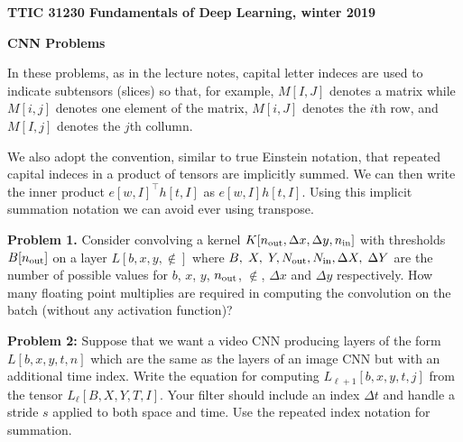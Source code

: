 \documentclass{article}
\newcommand{\solution}[1]{}
\begin{document}
\centerline{\bf TTIC 31230 Fundamentals of Deep Learning, winter 2019}

\medskip
\centerline{\bf CNN Problems}

In these problems, as in the lecture notes, capital letter indeces are used to indicate subtensors (slices) so that, for example,  $M[I,J]$ denotes a matrix
while $M[i,j]$ denotes one element of the matrix, $M[i,J]$ denotes the $i$th row, and $M[I,j]$ denotes the $j$th collumn.

\medskip
We also adopt the convention, similar to true Einstein notation, that repeated capital indeces in a product of tensors are implicitly summed.  We can then write
the inner product $e[w,I]^\top h[t,I]$ as $e[w,I]h[t,I]$.  Using this implicit summation notation we can avoid ever using transpose.

\bigskip
{\bf Problem 1.}  Consider convolving a kernel $K[n_{\mathrm{out}},\Delta x, \Delta y,n_{\mathrm{in}}]$  with thresholds $B[n_{\mathrm{out}}]$ on a layer $L[b,x,y,\nin]$ where $B,\;X,\;Y,N_{\mathrm{out}}, N_{\mathrm{in}},\Delta X,\;\Delta Y$
are the number of possible values for $b$, $x$, $y$, $n_{\mathrm{out}}$, $\nin$, $\Delta x$ and $\Delta y$ respectively.
How many floating point multiplies are required
in computing the convolution on the batch (without any activation function)?

\solution{$$BXY\;\Delta X\;\Delta Y \;\Nout \;\Nin$$}

\bigskip
{\bf Problem 2:} Suppose that we want a video CNN producing layers of the form $L[b,x,y,t,n]$ which are the same as the layers of an image CNN but with an additional time index.
Write the equation for computing $L_{\ell+1}[b,x,y,t,j]$ from the tensor $L_\ell[B,X,Y,T,I]$.  Your filter should include an index $\Delta t$ and handle a stride $s$ applied
to both space and time. Use the repeated index notation for summation.

\solution{
  $$L_{\ell + 1}[b,x,y,t,\nout] = \sigma(K_{\ell+1}[\nout \Delta X, \Delta Y, \Delta T, \Nin] L_\ell[b, sx+ \Delta X, sy + \Delta Y, st + \Delta T, \Nin]- B[\nout])$$
  }
\end{document}
